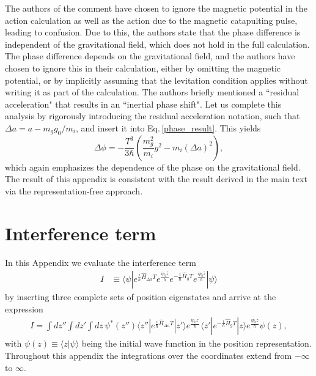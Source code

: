 \documentclass[aps,prx,onecolumn,superscriptaddress,longbibliography]{revtex4-2}
\begin{document}
\begin{appendix}
The authors of the comment have chosen to ignore the magnetic potential in the action calculation as well as the action due to the magnetic catapulting pulse, leading to confusion. Due to this, the authors state that the phase difference is independent of the gravitational field, which does not hold in the full calculation. The phase difference depends on the gravitational field, and the authors have chosen to ignore this in their calculation, either by omitting the magnetic potential, or by implicitly assuming that the levitation condition applies without writing it as part of the calculation. The authors briefly mentioned a ``residual acceleration" that results in an ``inertial phase shift". Let us complete this analysis by rigorously introducing the residual acceleration notation, such that $\Delta a = a - m_g g_0/m_i$, and insert it into Eq.\,\ref{phase_result}. This yields
\begin{equation}
    \Delta\phi = -\frac{T^3}{3 \hbar}\left(\frac{m_g^2}{m_i} g^2-m_i(\Delta a)^2\right) ,
\end{equation}
which again emphasizes the dependence of the phase on the gravitational field. The result of this appendix is consistent with the result derived in the main text via the representation-free approach.


\section{Interference term}

In this Appendix we evaluate the interference term
\begin{align}
    I &\equiv \langle \psi | e^{\frac{i}{\hbar} \hat{H}_{\Delta a} T} e^{\frac{i p_0 \hat{z}}{\hbar}} e^{-\frac{i}{\hbar} \hat{H}_g T} e^{\frac{i p_0 \hat{z}}{\hbar}} | \psi \rangle
\end{align}
by inserting three complete sets of position eigenstates and arrive at the expression
\begin{align}
    I =\int dz'' \int dz' \int dz\, \psi^*(z'') \langle z'' | e^{\frac{i}{\hbar} \hat{H}_{\Delta a} T} | z' \rangle e^{\frac{i p_0 z'}{\hbar}} \langle z' | e^{-\frac{i}{\hbar} \hat{H}_g T} | z \rangle e^{\frac{i p_0 z}{\hbar}} \psi(z),
    \label{Eq:I2}
\end{align}
with $ \psi(z)\equiv \langle z | \psi \rangle$ being the initial wave function in the position representation. Throughout this appendix the integrations over the coordinates extend from $-\infty$ to $\infty$.


\end{appendix}
\end{document}
